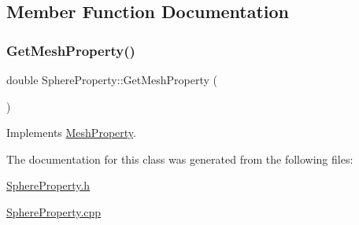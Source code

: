 \subsection{Member Function Documentation}
\mbox{\label{class_sphere_property_a61d802642205f2709812de5585705b10}} 
\subsubsection{\texorpdfstring{GetMeshProperty()}{GetMeshProperty()}}
{\footnotesize\ttfamily double Sphere\+Property\+::\+Get\+Mesh\+Property (\begin{DoxyParamCaption}{ }\end{DoxyParamCaption})\hspace{0.3cm}{\ttfamily [virtual]}}



Implements \mbox{\hyperlink{class_mesh_property_a0a50701a5c33ce7aec5c413b409a754f}{Mesh\+Property}}.



The documentation for this class was generated from the following files\+:\begin{DoxyCompactItemize}
\item 
\mbox{\hyperlink{_sphere_property_8h}{Sphere\+Property.\+h}}\item 
\mbox{\hyperlink{_sphere_property_8cpp}{Sphere\+Property.\+cpp}}\end{DoxyCompactItemize}
